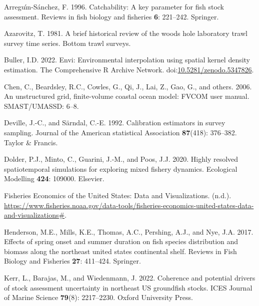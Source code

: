 \documentclass[
  12pt,
]{article}
\newlength{\cslhangindent}
\newlength{\cslentryspacingunit} %
\newenvironment{CSLReferences}[2] %
 {%
  \setlength{\parindent}{0pt}
  \ifodd #1
  \let\oldpar\par
  \def\par{\hangindent=\cslhangindent\oldpar}
  \fi
  \setlength{\parskip}{#2\cslentryspacingunit}
 }%
 {}
\begin{document}
\hypertarget{refs}{}
\begin{CSLReferences}{1}{0}
\leavevmode{}%
Arreguı́n-Sánchez, F. 1996. Catchability: A key parameter for fish stock assessment. Reviews in fish biology and fisheries \textbf{6}: 221--242. Springer.

\leavevmode{}%
Azarovitz, T. 1981. A brief historical review of the woods hole laboratory trawl survey time series. Bottom trawl surveys.

\leavevmode{}%
Buller, I.D. 2022. Envi: Environmental interpolation using spatial kernel density estimation. The Comprehensive R Archive Network. doi:\href{https://doi.org/10.5281/zenodo.5347826}{10.5281/zenodo.5347826}.

\leavevmode{}%
Chen, C., Beardsley, R.C., Cowles, G., Qi, J., Lai, Z., Gao, G., and others. 2006. An unstructured grid, finite-volume coastal ocean model: FVCOM user manual. SMAST/UMASSD: 6--8.

\leavevmode{}%
Deville, J.-C., and Särndal, C.-E. 1992. Calibration estimators in survey sampling. Journal of the American statistical Association \textbf{87}(418): 376--382. Taylor \& Francis.

\leavevmode{}%
Dolder, P.J., Minto, C., Guarini, J.-M., and Poos, J.J. 2020. Highly resolved spatiotemporal simulations for exploring mixed fishery dynamics. Ecological Modelling \textbf{424}: 109000. Elsevier.

\leavevmode{}%
{Fisheries Economics of the United States: Data and Visualizations}. (n.d.). \url{https://www.fisheries.noaa.gov/data-tools/fisheries-economics-united-states-data-and-visualizations\#}.

\leavevmode{}%
Henderson, M.E., Mills, K.E., Thomas, A.C., Pershing, A.J., and Nye, J.A. 2017. Effects of spring onset and summer duration on fish species distribution and biomass along the northeast united states continental shelf. Reviews in Fish Biology and Fisheries \textbf{27}: 411--424. Springer.

\leavevmode{}%
Kerr, L., Barajas, M., and Wiedenmann, J. 2022. Coherence and potential drivers of stock assessment uncertainty in northeast US groundfish stocks. ICES Journal of Marine Science \textbf{79}(8): 2217--2230. Oxford University Press.


\end{CSLReferences}
\end{document}
